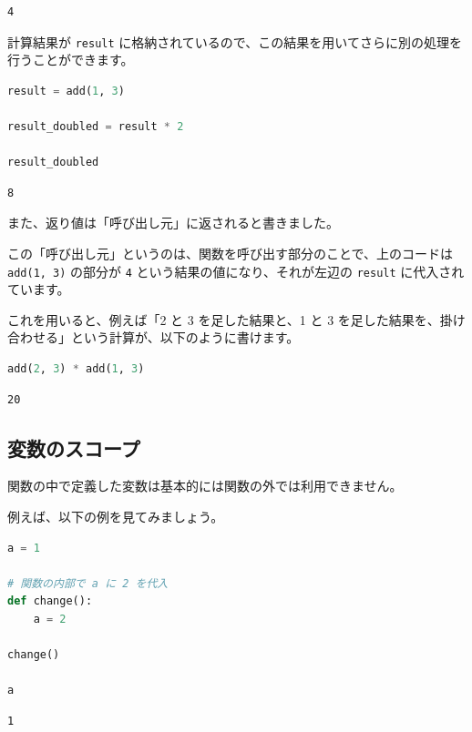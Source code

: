 \begin{lstlisting}[style=outputcell]
4
\end{lstlisting}

計算結果が \texttt{result} に格納されているので、この結果を用いてさらに別の処理を行うことができます。


\begin{lstlisting}[style=codecell,language=Python]
result = add(1, 3)

result_doubled = result * 2

result_doubled
\end{lstlisting}

\begin{lstlisting}[style=outputcell]
8
\end{lstlisting}

また、返り値は「呼び出し元」に返されると書きました。

この「呼び出し元」というのは、関数を呼び出す部分のことで、上のコードは \texttt{add(1, 3)} の部分が \texttt{4} という結果の値になり、それが左辺の \texttt{result} に代入されています。


これを用いると、例えば「2 と 3 を足した結果と、1 と 3 を足した結果を、掛け合わせる」という計算が、以下のように書けます。


\begin{lstlisting}[style=codecell,language=Python]
add(2, 3) * add(1, 3)
\end{lstlisting}

\begin{lstlisting}[style=outputcell]
20
\end{lstlisting}

\subsection{変数のスコープ}


関数の中で定義した変数は基本的には関数の外では利用できません。

例えば、以下の例を見てみましょう。


\begin{lstlisting}[style=codecell,language=Python]
a = 1

# 関数の内部で a に 2 を代入
def change():
    a = 2
    
change()

a
\end{lstlisting}

\begin{lstlisting}[style=outputcell]
1
\end{lstlisting}

